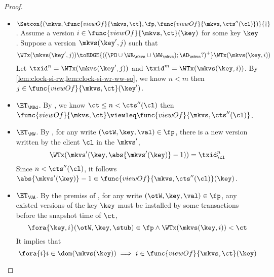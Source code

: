 \begin{proof}
\begin{itemize}
        \item \( \Setcon{(\mkvs, \func{viewOf}{\mkvs,\ct}, \fp, \func{viewOf}{\mkvs,\cts''(\cl)})}{\dagger} \).
            Assume a version \( i \in \func{viewOf}{\mkvs,\ct}(\key) \) for some key \( \key \).
            Suppose a version \( \mkvs(\key',j)\) such that 
            \[ 
                \WTx(\mkvs(\key',j)) \toEDGE{((\PO \cup \WR_{\mkvs} \cup \WW_{\mkvs}) ; \AD_{\mkvs}?)^+} \WTx(\mkvs(\key,i))
            \]
            Let \( \txid^n = \WTx(\mkvs(\key',j)) \) and \( \txid^m = \WTx(\mkvs(\key,i)) \).
            By \cref{lem:clock-si-rw,lem:clock-si-wr-ww-so}, we know \( n < m \) then \( j  \in \func{viewOf}{\mkvs,\ct}(\key')\).
        \item \( \ET_\MRd \).
            By , we know \( \ct \leq n < \cts''(\cl) \) then \( \func{viewOf}{\mkvs,\ct} \viewleq \func{viewOf}{\mkvs,\cts''(\cl)} \).
        \item \( \ET_\MW \).
            By , for any write \( (\otW, \key, \val) \in \fp \), there is a new version written by the client \( \cl \) in the \( \mkvs'  \),
            \[
                \WTx(\mkvs'(\key,\abs{\mkvs'(\key)} - 1)) = \txid_\cl^{n}
            \]
            Since \( n < \cts''(\cl)\), it follows \( \abs{\mkvs'(\key)} - 1 \in \func{viewOf}{\mkvs,\cts''(\cl)}(\key) \).
        \item \( \ET_\UA \).
            By the premiss of , for any write \( (\otW, \key, \val) \in \fp \), any existed versions of the key \( \key \)
            must be installed by some transactions before the snapshot time of \( \ct \),
            \[
                \fora{\key,i} (\otW, \key, \stub) \in \fp \land \WTx(\mkvs(\key,i)) < \ct 
            \]
            It implies that 
            \[ 
                \fora{i} i \in \dom(\mkvs(\key)) \implies i \in \func{viewOf}{\mkvs,\ct}(\key) 
            \]
    \end{itemize}
\end{proof}

